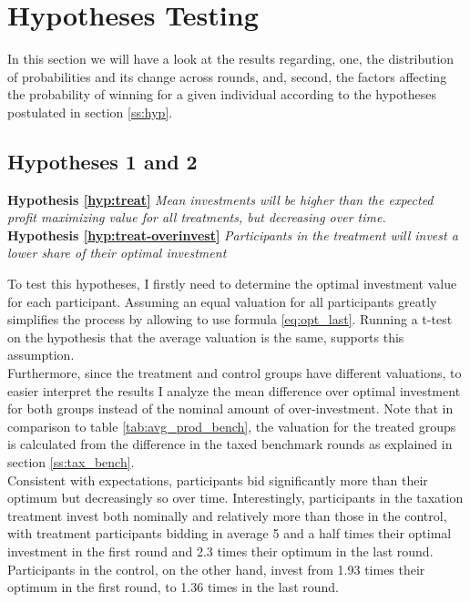 \section{Hypotheses Testing}

In this section we will have a look at the results regarding, one, the distribution of probabilities and its change across rounds, and, second, the factors affecting the probability of winning for a given individual according to the hypotheses postulated in section \ref{ss:hyp}.


\subsection{Hypotheses 1 and 2}

\textbf{Hypothesis \ref{hyp:treat}} \textit{Mean investments will be higher than the expected profit maximizing value for all treatments, but decreasing over time.}\\ 
\textbf{Hypothesis \ref{hyp:treat-overinvest}} \textit{Participants in the treatment will invest a lower share of their optimal investment}

To test this hypotheses, I firstly need to determine the optimal investment value for each participant. Assuming an equal valuation for all participants greatly simplifies the process by allowing to use formula \ref{eq:opt_last}. Running a t-test on the hypothesis that the average valuation is the same, supports this assumption.\\

Furthermore, since the treatment and control groups have different valuations, to easier interpret the results I analyze the mean difference over optimal investment for both groups instead of the nominal amount of over-investment. Note that in comparison to table \ref{tab:avg_prod_bench}, the valuation for the treated groups is calculated from the difference in the taxed benchmark rounds as explained in section \ref{ss:tax_bench}.\\

Consistent with expectations, participants bid significantly more than their optimum but decreasingly so over time. Interestingly, participants in the taxation treatment invest both nominally and relatively more than those in the control, with treatment participants bidding in average 5 and a half times their optimal investment in the first round and 2.3 times their optimum in the last round. Participants in the control, on the other hand, invest from 1.93 times their optimum in the first round, to 1.36 times in the last round.\\


